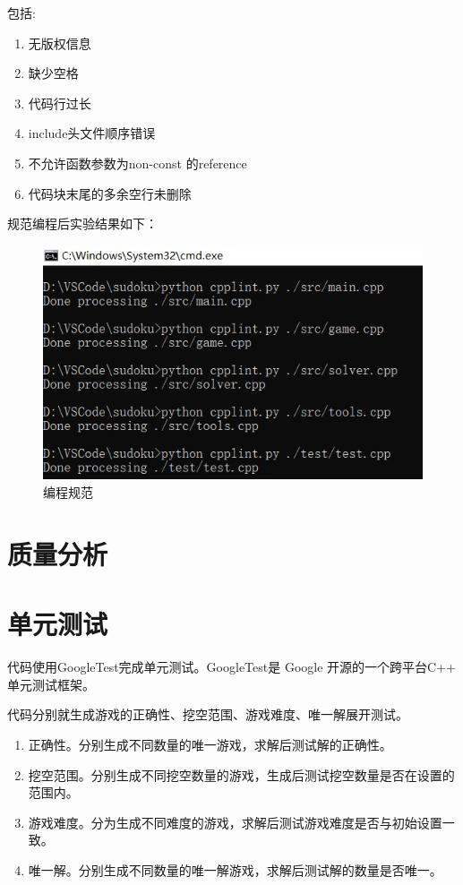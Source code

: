 \documentclass[a4paper]{article}
\begin{document}
包括:

\begin{enumerate}
	\item 无版权信息
	\item 缺少空格
	\item 代码行过长
	\item include头文件顺序错误
	\item 不允许函数参数为non-const 的reference
	\item 代码块末尾的多余空行未删除
\end{enumerate}

规范编程后实验结果如下：

\begin{figure}[!ht]
  \centering
  \includegraphics[scale=0.9]{images/cpplint.jpg}
  \caption{编程规范}
  \label{fig:cpplint}
\end{figure}

\section{质量分析}
\section{单元测试}
代码使用GoogleTest完成单元测试。GoogleTest是 Google 开源的一个跨平台C++ 单元测试框架。

代码分别就生成游戏的正确性、挖空范围、游戏难度、唯一解展开测试。
\begin{enumerate}
  \item 正确性。分别生成不同数量的唯一游戏，求解后测试解的正确性。
  \item 挖空范围。分别生成不同挖空数量的游戏，生成后测试挖空数量是否在设置的范围内。
  \item 游戏难度。分为生成不同难度的游戏，求解后测试游戏难度是否与初始设置一致。
  \item 唯一解。分别生成不同数量的唯一解游戏，求解后测试解的数量是否唯一。
\end{enumerate}
\end{document}
